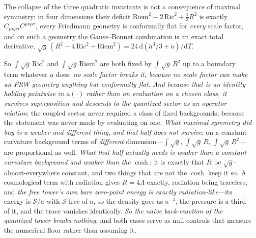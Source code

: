 \documentclass[11pt,a4paper]{article}
\theoremstyle{plain}
\theoremstyle{definition}
\theoremstyle{remark}
\newcommand{\dd}{\mathrm{d}}   %
\begin{document}
The collapse of the three quadratic invariants is not a consequence of maximal symmetry:
in four dimensions their deficit $\mathrm{Riem}^{2}-2\,\mathrm{Ric}^{2}+\tfrac13R^{2}$ is exactly
$C_{\mu\nu\rho\sigma}C^{\mu\nu\rho\sigma}$, every Friedmann geometry is conformally flat for
\emph{every} scale factor, and on such a geometry the Gauss--Bonnet combination is an exact total
derivative, $\sqrt{g}\,(R^{2}-4\,\mathrm{Ric}^{2}+\mathrm{Riem}^{2})=24\,\dd(\dot a^{3}/3+\dot
a)/\dd T$. 

So $\int\!\sqrt g\,\mathrm{Ric}^{2}$ and $\int\!\sqrt g\,\mathrm{Riem}^{2}$ are both
fixed by $\int\!\sqrt g\,R^{2}$ up to a boundary term whatever $a$ does: \emph{no scale factor breaks
it, because no scale factor can make an FRW geometry anything but conformally
flat}.
\emph{And because that is an identity holding pointwise in $a(\cdot)$ rather than an evaluation on a
chosen class, it survives superposition and descends to the quantized sector as an operator relation}:
the coupled sector never required a class of fixed backgrounds, because the statement was never made by
evaluating on one. \emph{What maximal symmetry did buy is a weaker and different thing, and that half
does not survive}: on a constant-curvature background terms of \emph{different} dimension---$\int\!
\sqrt g$, $\int\!\sqrt g\,R$, $\int\!\sqrt g\,R^{2}$---are proportional as well. \emph{What that half
actually needs is weaker than a constant-curvature background and weaker than the $\cosh$}: it is
exactly that $R$ be $\sqrt g$-almost-everywhere constant, and two things that are not the $\cosh$ keep it
so. A cosmological term with radiation gives $R=4\Lambda$ exactly, radiation being traceless; and
\emph{the free tower's own bare zero-point energy is exactly radiation-like}---its energy is
$\mathcal S/a$ with $\mathcal S$ free of $a$, so the density goes as $a^{-4}$, the pressure is a third of
it, and the trace vanishes identically. \emph{So the naive back-reaction of the quantized tower breaks
nothing}, and both cases serve as null controls that measure the numerical floor rather than assuming
it.
\end{document}
